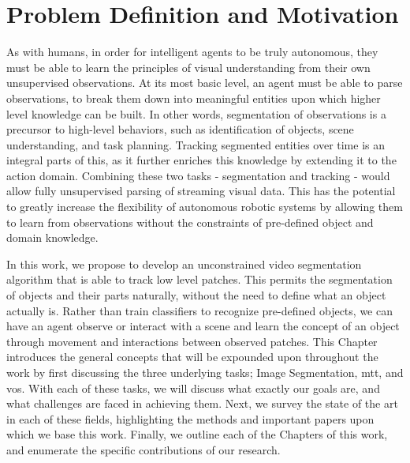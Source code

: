 \section{Problem Definition and Motivation}
As with humans, in order for intelligent agents to be truly autonomous, they must be able to learn the principles of visual understanding from their own unsupervised observations. At its most basic level, an agent must be able to parse observations, to break them down into meaningful entities upon which higher level knowledge can be built. In other words, segmentation of observations is a precursor to high-level behaviors, such as identification of objects, scene understanding, and task planning. Tracking segmented entities over time is an integral parts of this, as it further enriches this knowledge by extending it to the action domain. Combining these two tasks - segmentation and tracking - would allow fully unsupervised parsing of streaming visual data.   This has the potential to greatly increase the flexibility of autonomous robotic systems by allowing them to learn from observations without the constraints of pre-defined object and domain knowledge.

In this work, we propose to develop an unconstrained video segmentation algorithm that is able to track low level patches. This permits the segmentation of objects and their parts naturally, without the need to define what an object actually is. Rather than train classifiers to recognize pre-defined objects, we can have an agent observe or interact with a scene and learn the concept of an object through movement and interactions between observed patches. This Chapter introduces the general concepts that will be expounded upon throughout the work by first discussing the three underlying tasks; Image Segmentation, \gls{mtt}, and \gls{vos}. With each of these tasks, we will discuss what exactly our goals are, and what challenges are faced in achieving them. Next, we survey the state of the art in each of these fields, highlighting the methods and important papers upon which we base this work. Finally, we outline each of the Chapters of this work, and enumerate the specific contributions of our research.

